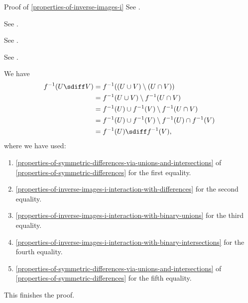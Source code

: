\begin{Proof}{Proof of \cref{properties-of-inverse-images-i}}
    See \cite{proof-wiki:preimage-of-union-under-mapping}.

    See \cite{proof-wiki:preimage-of-intersection-under-mapping}.

    See \cite{proof-wiki:preimage-of-set-difference-under-mapping}.

    See \cite{proof-wiki:complement-of-preimage-equals-preimage-of-complement}.

    We have
    \begin{align*}
        f^{-1}(U\sdiff V) &= f^{-1}((U\cup V)\setminus(U\cap V))\\
                          &= f^{-1}(U\cup V)\setminus f^{-1}(U\cap V)\\
                          &= f^{-1}(U)\cup f^{-1}(V)\setminus f^{-1}(U\cap V)\\
                          &= f^{-1}(U)\cup f^{-1}(V)\setminus f^{-1}(U)\cap f^{-1}(V)\\
                          &= f^{-1}(U)\sdiff f^{-1}(V),
    \end{align*}
    where we have used:
    \begin{enumerate}
        \item\label{proof-of-properties-of-inverse-images-i-interaction-with-symmetric-differences-1}\cref{properties-of-symmetric-differences-via-unions-and-intersections} of \cref{properties-of-symmetric-differences} for the first equality.
        \item\label{proof-of-properties-of-inverse-images-i-interaction-with-symmetric-differences-2}\cref{properties-of-inverse-images-i-interaction-with-differences} for the second equality.
        \item\label{proof-of-properties-of-inverse-images-i-interaction-with-symmetric-differences-3}\cref{properties-of-inverse-images-i-interaction-with-binary-unions} for the third equality.
        \item\label{proof-of-properties-of-inverse-images-i-interaction-with-symmetric-differences-4}\cref{properties-of-inverse-images-i-interaction-with-binary-intersections} for the fourth equality.
        \item\label{proof-of-properties-of-inverse-images-i-interaction-with-symmetric-differences-5}\cref{properties-of-symmetric-differences-via-unions-and-intersections} of \cref{properties-of-symmetric-differences} for the fifth equality.
    \end{enumerate}
    This finishes the proof.


\end{Proof}

